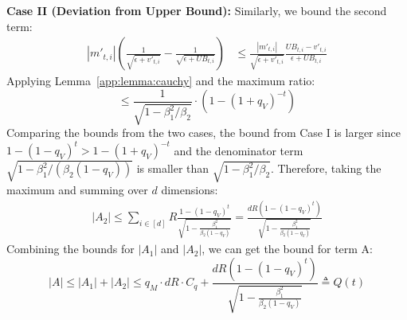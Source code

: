 \documentclass[11pt, letterpaper]{article}
\begin{document}
\textbf{Case II (Deviation from Upper Bound):} Similarly, we bound the second term:
\begin{align*}
    |m'_{t,i}| \left( \frac{1}{\sqrt{\epsilon+v'_{t,i}}} - \frac{1}{\sqrt{\epsilon+UB_{t,i}}} \right) 
    &\le \frac{|m'_{t,i}|}{\sqrt{\epsilon+v'_{t,i}}} \frac{UB_{t,i} - v'_{t,i}}{\epsilon+UB_{t,i}}
\end{align*}
Applying Lemma~\ref{app:lemma:cauchy} and the maximum ratio:
\begin{equation*}
    \le \frac{1}{\sqrt{1 - \beta_1^2/\beta_2}} \cdot \left( 1 - (1+q_V)^{-t} \right)
\end{equation*}
Comparing the bounds from the two cases, the bound from Case I is larger since $1-(1-q_V)^t > 1-(1+q_V)^{-t}$ and the denominator term $\sqrt{1 - \beta_1^2/(\beta_2(1-q_V))}$ is smaller than $\sqrt{1 - \beta_1^2/\beta_2}$. Therefore, taking the maximum and summing over $d$ dimensions:
\begin{align}
    |A_2| \le \sum_{i\in[d]} R \frac{1-(1-q_V)^t}{\sqrt{1-\frac{\beta_1^2}{\beta_2(1-q_V)}}} = \frac{dR(1-(1-q_V)^t)}{\sqrt{1-\frac{\beta_1^2}{\beta_2(1-q_V)}}}
\end{align}
Combining the bounds for $|A_1|$ and $|A_2|$, we can get the bound for term A:
\begin{equation}
|A| \le |A_1| + |A_2| \le q_M \cdot dR \cdot C_q + \frac{dR(1-(1-q_V)^t)}{\sqrt{1-\frac{\beta_1^2}{\beta_2(1-q_V)}}}  \triangleq Q(t)
\end{equation}
\end{document}
